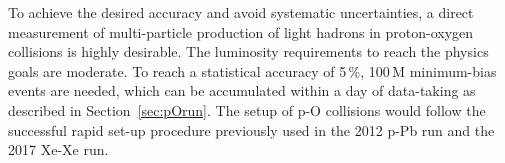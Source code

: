 \documentclass[../report.tex]{subfiles}
\begin{document}
To achieve the desired accuracy and avoid systematic uncertainties, a direct measurement of multi-particle production of light hadrons in proton-oxygen collisions is highly desirable. The luminosity requirements to reach the physics goals are moderate. To reach a statistical accuracy of 5\,\%, 100\,M minimum-bias events are needed, which can be accumulated within a day of data-taking as described in Section~\ref{sec:pOrun}. The setup of p-O collisions would follow the successful rapid set-up procedure previously used in the 2012 p-Pb run and the 2017 Xe-Xe run.
\end{document}

